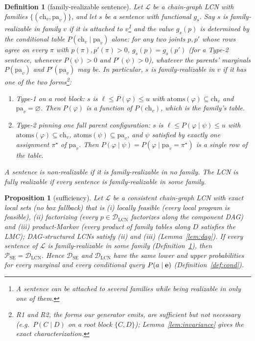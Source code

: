 \documentclass{article} %
\DeclareRobustCommand{\rev}[1]{{\color{blue}#1}}
\newenvironment{revblock}{\color{blue}}{}
\newtheorem{definition}{Definition}
\newtheorem{proposition}{Proposition}
\newcommand{\DSE}{\mathcal{D}_{\mathrm{SE}}}
\newcommand{\DLCN}{\mathcal{D}_{\mathrm{LCN}}}
\newcommand{\ch}{\mathrm{ch}}
\newcommand{\pa}{\mathrm{pa}}
\newcommand{\atoms}{\mathrm{atoms}}
\begin{document}
\begin{definition}[family-realizable sentence]\label{def:realizable}
Let $\mathcal L$ be a chain-graph LCN with families $\{(\ch_v,\pa_v)\}$, and let $s$ be a sentence
with functional $g_s$. Say $s$ is \emph{family-realizable in family $v$} if it is attached to $v$\footnote{A sentence can be attached to several families while being realizable in only one of them.} and the value $g_s(p)$ is determined by the conditional table
$P(\ch_v\mid\pa_v)$ \emph{alone}: for any two joints $p,p'$ whose rows agree \rev{on every $\pi$ with $p(\pi),p'(\pi)>0$}, $g_s(p)=g_s(p')$ (for a Type-2 sentence, whenever
$P(\psi)>0$ and $P'(\psi)>0$), whatever the parents' marginals
$P(\pa_v)$ and $P'(\pa_v)$ may be. \rev{In particular, $s$ is family-realizable in $v$ if it has one of
the two forms}\rev{\footnote{R1 and R2, the forms our generator emits, are sufficient but not necessary (e.g.\ $P(C\mid D)$ on a root block $\{C,D\}$); Lemma~\ref{lem:invariance} gives the exact characterization.}}:
\begin{enumerate}
  \item[\textup{(R1)}] \emph{Type-1 on a root block:} $s$ is $\ell\le P(\varphi)\le u$ with
    $\atoms(\varphi)\subseteq\ch_v$ and $\pa_v=\varnothing$. Then $P(\varphi)$ is a function of
    $P(\ch_v)$, which \emph{is} the family's table.
  \item[\textup{(R2)}] \emph{Type-2 pinning one full parent configuration:} $s$ is
    $\ell\le P(\varphi\mid\psi)\le u$ with $\atoms(\varphi)\subseteq\ch_v$,
    $\atoms(\psi)\subseteq\pa_v$, and $\psi$ satisfied by \emph{exactly one} assignment $\pi^\star$
    of $\pa_v$. Then $P(\varphi\mid\psi)=P(\varphi\mid\pa_v{=}\pi^\star)$ is a single row of the
    table.
\end{enumerate}
A sentence is \emph{non-realizable} if it is family-realizable in no family. The LCN is \emph{fully
realizable} if every sentence is family-realizable in some family.
\end{definition}

\begin{revblock}
\begin{proposition}[sufficiency]\label{prop:suff}
Let $\mathcal L$ be a consistent chain-graph LCN with exact local sets (no box fallback) that is (i) \emph{locally feasible} (every local program is feasible), (ii) \emph{factorizing} (every $p\in\DLCN$ factorizes along the component DAG) and (iii) \emph{product-Markov} (every product of family tables along $D$ satisfies the LMC); \emph{DAG-structured} LCNs satisfy (ii) and (iii) (Lemma~\ref{lem:dag}). If every sentence of $\mathcal L$ is family-realizable in some family (Definition~\ref{def:realizable}), then $\mathcal P_{\mathrm{SE}}=\DLCN$. Hence $\DSE$ and $\DLCN$ have the same lower and upper probabilities for every marginal and every conditional query $P(a\mid\mathbf{e})$ (Definition~\ref{def:cond}).
\end{proposition}
\end{revblock}
\end{document}
